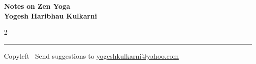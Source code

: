 \documentclass[9pt,a4paper,landscape]{article}
\begin{document}
\footnotesize


\begin{center}
\Large{\textbf{Notes on Zen Yoga\\ Yogesh Haribhau Kulkarni}}  
\end{center}

\begin{multicols}{2}

\end{multicols}

\rule{\linewidth}{0.25pt}
\scriptsize
Copyleft \textcopyleft\  Send suggestions to 
\href{http://www.yogeshkulkarni.com}{yogeshkulkarni@yahoo.com}
\end{document}
